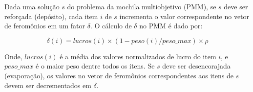 Dada uma solução $s$ do problema da mochila multiobjetivo (PMM), se $s$ deve ser reforçada (depósito), cada item $i$ de $s$ incrementa o valor correspondente no vetor de feromônios em um fator $\delta$. O cálculo de $\delta$ no PMM é dado por:

\begin{equation}\delta(i) = lucros(i) \times (1 - peso(i) / peso\_{max}) \times \rho\end{equation}

Onde, $lucros(i)$ é a média dos valores normalizados de lucro do item $i$, e $peso\_{max}$ é o maior peso dentre todos os itens. Se $s$ deve ser desencorajada (evaporação), os valores no vetor de feromônios correspondentes aos itens de $s$ devem ser decrementados em $\delta$.